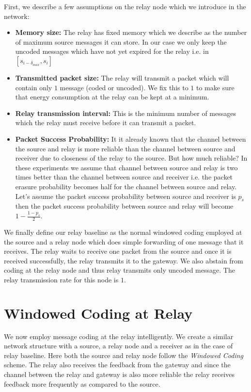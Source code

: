 First, we describe a few assumptions on the relay node which we introduce in the network:
\begin{itemize}
	\item \textbf{Memory size:} The relay has fixed memory which we describe as the number of maximum source messages it can store. In our case we only keep the uncoded messages which have not yet expired for the relay i.e. in $[s_{i-\delta_{max}}, s_i]$
	\item \textbf{Transmitted packet size:} The relay will transmit a packet which will contain only $1$ message (coded or uncoded). We fix this to $1$ to make sure that energy consumption at the relay can be kept at a minimum.
	\item \textbf{Relay transmission interval:} This is the minimum number of messages which the relay must receive before it can transmit a packet.
	\item \textbf{Packet Success Probability:} It it already known that the channel between the source and relay is more reliable than the channel between source and receiver due to closeness of the relay to the source. But how much reliable? In these experiments we assume that channel between source and relay is two times better than the channel between source and receiver i.e. the packet erasure probability becomes half for the channel between source and relay. Let's assume the packet success probability between source and receiver is $p_s$ then the packet success probability between source and relay will become $1-\frac{1-p_s}{2}$.
\end{itemize} 

We finally define our relay baseline as the normal windowed coding employed at the source and a relay node which does simple forwarding of one message that it receives. The relay waits to receive one packet from the source and once it is received successfully, the relay transmits it to the gateway. We also abstain from coding at the relay node and thus relay transmits only uncoded message. The relay transmission rate for this node is $1$.

\section{Windowed Coding at Relay}
We now employ message coding at the relay intelligently. We create a similar network structure with a source, a relay node and a receiver as in the case of relay baseline. Here both the source and relay node follow the \textit{Windowed Coding} scheme. The relay also receives the feedback from the gateway and since the channel between the relay and gateway is also more reliable the relay receives feedback more frequently as compared to the source.

